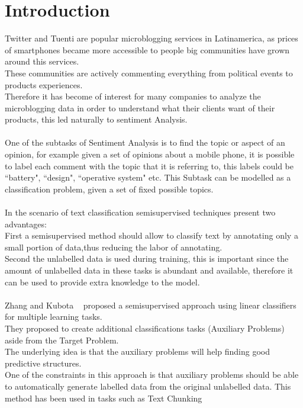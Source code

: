 \documentclass[4pt,a4paper,twocolumn]{article}
\begin{document}
\section{Introduction}
Twitter and Tuenti are popular microblogging services in Latinamerica,
as prices of smartphones became more accessible to people big communities
have grown around this services.\\
These communities are actively commenting everything from political events to products experiences.\\
Therefore it has become of interest for many companies to analyze the microblogging data in order to understand
what their clients want of their products, this led naturally to sentiment Analysis.\\
\\
One of the subtasks of Sentiment Analysis is to find the topic or aspect of an opinion,
for example given a set of opinions about a mobile phone, it is possible to label each comment
with the topic that it is referring to, this labels could be ``battery", ``design", ``operative system" etc.
This Subtask can be modelled as a classification problem, given a set of fixed possible topics.\\
\\
In the scenario of text classification semisupervised techniques present two advantages:\\
First a semisupervised method should allow to classify text by annotating only a small portion of data,thus reducing the labor of annotating.\\
Second the unlabelled data is used during training, this is important since the amount of unlabelled data in these tasks is abundant and available, therefore it can be used to provide extra knowledge to the model.\\
\\
Zhang and Kubota ~\cite{Ando:2005:FLP:1046920.1194905} proposed a semisupervised approach using linear classifiers for multiple learning tasks.\\
They proposed to create additional classifications tasks (Auxiliary Problems) aside from the Target Problem.\\
The underlying idea is that the auxiliary problems will help finding good predictive structures.\\
One of the constraints in this approach is that auxiliary problems should be  able to automatically generate labelled data from the original unlabelled data.
This method has been used in tasks such as Text Chunking ~\cite{Ando:2005:HSL:1219840.1219841}\\
\end{document}
